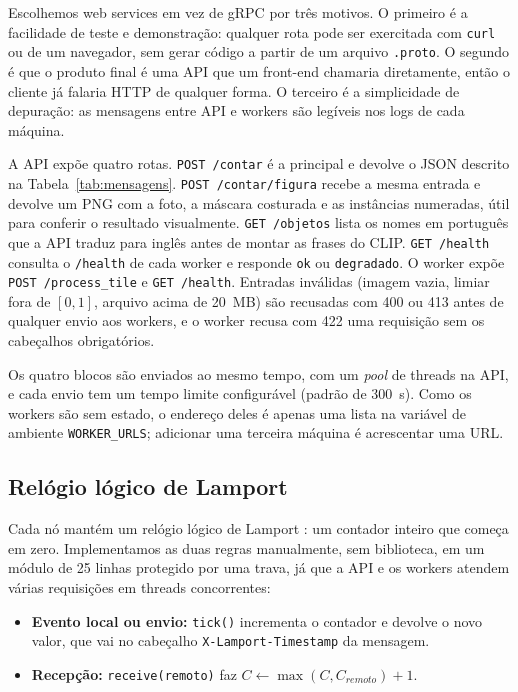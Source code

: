 \documentclass{sbc2023}
\begin{document}
Escolhemos web services em vez de gRPC por três motivos. O primeiro é a facilidade de teste e demonstração: qualquer rota pode ser exercitada com \texttt{curl} ou de um navegador, sem gerar código a partir de um arquivo \texttt{.proto}. O segundo é que o produto final é uma API que um front-end chamaria diretamente, então o cliente já falaria HTTP de qualquer forma. O terceiro é a simplicidade de depuração: as mensagens entre API e workers são legíveis nos logs de cada máquina.

A API expõe quatro rotas. \texttt{POST /contar} é a principal e devolve o JSON descrito na Tabela~\ref{tab:mensagens}. \texttt{POST /contar/figura} recebe a mesma entrada e devolve um PNG com a foto, a máscara costurada e as instâncias numeradas, útil para conferir o resultado visualmente. \texttt{GET /objetos} lista os nomes em português que a API traduz para inglês antes de montar as frases do CLIP. \texttt{GET /health} consulta o \texttt{/health} de cada worker e responde \texttt{ok} ou \texttt{degradado}. O worker expõe \texttt{POST /process\_tile} e \texttt{GET /health}. Entradas inválidas (imagem vazia, limiar fora de $[0,1]$, arquivo acima de 20~MB) são recusadas com 400 ou 413 antes de qualquer envio aos workers, e o worker recusa com 422 uma requisição sem os cabeçalhos obrigatórios.

Os quatro blocos são enviados ao mesmo tempo, com um \emph{pool} de threads na API, e cada envio tem um tempo limite configurável (padrão de 300~s). Como os workers são sem estado, o endereço deles é apenas uma lista na variável de ambiente \texttt{WORKER\_URLS}; adicionar uma terceira máquina é acrescentar uma URL.

\subsection{Relógio lógico de Lamport}

Cada nó mantém um relógio lógico de Lamport \citep{lamport1978}: um contador inteiro que começa em zero. Implementamos as duas regras manualmente, sem biblioteca, em um módulo de 25 linhas protegido por uma trava, já que a API e os workers atendem várias requisições em threads concorrentes:

\begin{itemize}
\item \textbf{Evento local ou envio:} \texttt{tick()} incrementa o contador e devolve o novo valor, que vai no cabeçalho \texttt{X-Lamport-Timestamp} da mensagem.
\item \textbf{Recepção:} \texttt{receive(remoto)} faz $C \leftarrow \max(C, C_{remoto}) + 1$.
\end{itemize}
\end{document}
